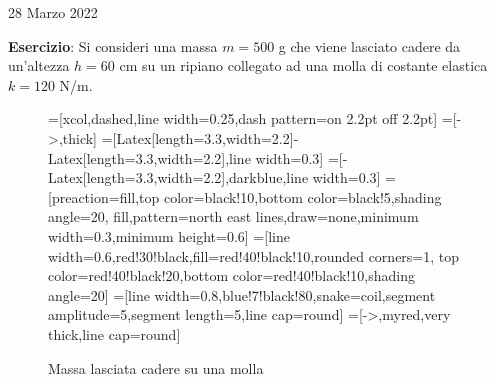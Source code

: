 \documentclass[a4paper]{extarticle}
\begin{document}
\newpage
\noindent
\begin{center}
  28 Marzo 2022
\end{center}
\textbf{Esercizio}: Si consideri una massa $m=500$ g che viene lasciato cadere da un'altezza $h=60$ cm su un ripiano collegato ad una molla di costante elastica $k=120$ N/m.

\begin{figure}[H]
  \centering
  =[xcol,dashed,line width=0.25,dash pattern=on 2.2pt off 2.2pt]
  =[->,thick] %
  =[{Latex[length=3.3,width=2.2]}-{Latex[length=3.3,width=2.2]},line width=0.3]
  =[-{Latex[length=3.3,width=2.2]},darkblue,line width=0.3]
  =[preaction={fill,top color=black!10,bottom color=black!5,shading angle=20},
                      fill,pattern=north east lines,draw=none,minimum width=0.3,minimum height=0.6]
  =[line width=0.6,red!30!black,fill=red!40!black!10,rounded corners=1,
                    top color=red!40!black!20,bottom color=red!40!black!10,shading angle=20]
  =[line width=0.8,blue!7!black!80,snake=coil,segment amplitude=5,segment length=5,line cap=round]
  \tikzset{>=latex} %
  =[->,myred,very thick,line cap=round]
  \def\tick#1#2{\draw[thick] (#1)++(#2:0.1) --++ (#2-180:0.2)}

  \caption{Massa lasciata cadere su una molla}
  \label{fig:massa_lasciata_cadere_molla}
\end{figure}
\end{document}
